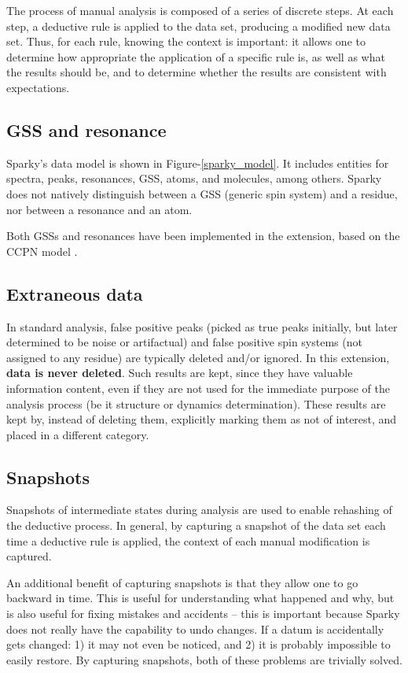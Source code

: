 The process of manual analysis is composed of a series of discrete steps.
At each step, a deductive rule is applied to the data set, producing a
modified new data set.  Thus, for each rule, knowing the context is important:
it allows one to determine how appropriate the application of a specific rule
is, as well as what the results should be, and to determine whether the 
results are consistent with expectations.

\subsection{GSS and resonance}
Sparky's data model is shown in Figure-\ref{sparky_model}.  It includes 
entities for spectra, peaks, resonances, GSS, atoms, and molecules, among
others.  Sparky does not natively distinguish between a GSS (generic spin 
system) and a residue, nor between a resonance and an atom.

Both GSSs and resonances have been implemented in the extension, based 
on the CCPN model \cite{ccpn}.

\subsection{Extraneous data}
In standard analysis, false positive peaks (picked as true peaks initially,
but later determined to be noise or artifactual) and false positive spin 
systems (not assigned to any residue) are typically deleted and/or ignored.
In this extension, \textbf{data is never deleted}.  Such results are kept,
since they have valuable information content, even if they are not used for
the immediate purpose of the analysis process (be it structure or dynamics
determination).  These results are kept by, instead of deleting them, 
explicitly marking them as not of interest, and placed in a different
category.

\subsection{Snapshots}
Snapshots of intermediate states during analysis are used to enable rehashing
of the deductive process.  In general, by capturing a snapshot of the data set
each time a deductive rule is applied, the context of each manual modification
is captured.

An additional benefit of capturing snapshots is that they allow one to go 
backward in time.  This is useful for understanding what happened and
why, but is also useful for fixing mistakes and accidents -- this is
important because Sparky does not really have the capability to undo
changes.  If a datum is accidentally gets changed: 1) it may not even
be noticed, and 2) it is probably impossible to easily restore.  By capturing
snapshots, both of these problems are trivially solved.

